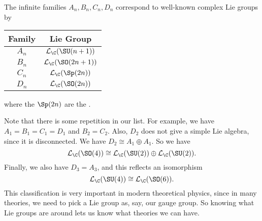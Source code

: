 \documentclass[a4paper]{article}
\begin{document}
\begin{thm}
\begin{center}
  \end{center}
  \begin{center}
  \end{center}
\end{thm}

\begin{eg}
  The infinite families $A_n, B_n, C_n, D_n$ correspond to well-known complex Lie groups by
  \begin{center}
    \begin{tabular}{cc}
      \toprule
      Family & Lie Group\\
      \midrule
      $A_n$ & $\mathcal{L}_\C(\SU(n + 1))$\\
      $B_n$ & $\mathcal{L}_\C(\SO(2n + 1))$\\
      $C_n$ & $\mathcal{L}_\C (\Sp(2n))$\\
      $D_n$ & $\mathcal{L}_\C (\SO(2n))$\\
      \bottomrule
    \end{tabular}
  \end{center}
  where the $\Sp(2n)$ are the .
\end{eg}

Note that there is some repetition in our list. For example, we have $A_1 = B_1 = C_1 = D_1$ and $B_2 = C_2$. Also, $D_2$ does not give a simple Lie algebra, since it is disconnected. We have $D_2 \cong A_1 \oplus A_1$. So we have
\[
  \mathcal{L}_\C(\SO(4)) \cong \mathcal{L}_\C(\SU(2)) \oplus \mathcal{L}_\C(\SU(2)).
\]
Finally, we also have $D_3 = A_3$, and this reflects an isomorphism
\[
  \mathcal{L}_\C(\SU(4)) \cong \mathcal{L}_\C(\SO(6)).
\]
This classification is very important in modern theoretical physics, since in many theories, we need to pick a Lie group as, say, our gauge group. So knowing what Lie groups are around lets us know what theories we can have.
\end{document}
